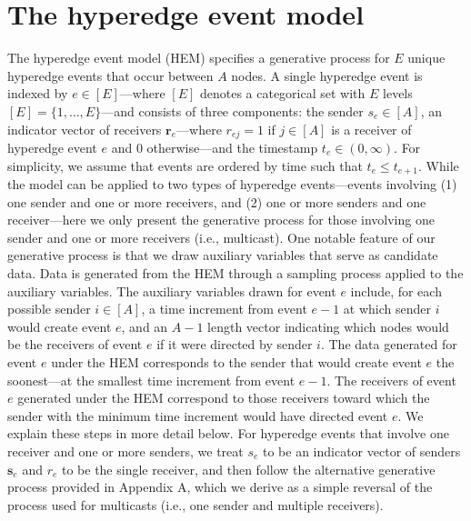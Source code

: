 \documentclass[ba]{imsart}
\numberwithin{equation}{section}
\theoremstyle{plain}
\begin{document}
	\section{The hyperedge event model}\label{sec:generative process}
	

	The hyperedge event model (HEM) specifies a generative process for $E$ unique hyperedge events that occur between $A$ nodes. A single hyperedge event is indexed by $e \in [E]$---where $[E]$ denotes a categorical set with $E$ levels $[E] = \{1,\ldots,E\}$---and consists of three components: the sender $s_e \in [A]$, an indicator vector of receivers $\boldsymbol{r}_e$---where $r_{ej}=1$ if $j \in [A]$ is a receiver of hyperedge event $e$ and 0 otherwise---and the timestamp $t_e \in (0, \infty)$. For simplicity, we assume that events are ordered by time such that $t_e \leq t_{e+1}$. While the model can be applied to two types of hyperedge events---events involving (1) one sender and one or more receivers, and (2) one or more senders and one receiver---here we only present the generative process for those involving one sender and one or more receivers (i.e., multicast). One notable feature of our generative process is that we draw auxiliary variables that serve as candidate data. Data is generated from the HEM through a sampling process applied to the auxiliary variables. The auxiliary variables drawn for event $e$ include, for each possible sender $i \in [A]$, a time increment from event $e-1$ at which sender $i$ would create event $e$, and an $A-1$ length vector indicating which nodes would be the receivers of event $e$ if it were directed by sender $i$.  The data generated for event $e$ under the HEM corresponds to the sender that would create event $e$ the soonest---at the smallest time increment from event $e-1$. The receivers of event $e$ generated under the HEM correspond to those receivers toward which the sender with the minimum time increment would have directed event $e$. We explain these steps in more detail below. For hyperedge events that involve one receiver and one or more senders, we treat $s_e$ to be an indicator vector of senders $\boldsymbol{s}_e$ and $r_e$ to be the single receiver, and then follow the alternative generative process provided in Appendix A, which we derive as a simple reversal of the process used for multicasts (i.e., one sender and multiple receivers).~ 
	
\end{document}
